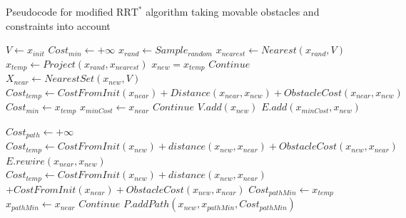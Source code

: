 \begin{algorithm}[H]
\caption{Pseudocode for modified $\text{RRT}^*$ algorithm taking movable obstacles and constraints into account}
\label{pseudocode:proposed_rrt_star}
\begin{algorithmic}[1]
\State $V \leftarrow x_{init}$
    \State $Cost_{min} \leftarrow +\infty$ 
    \State $x_{rand} \leftarrow Sample_{random}$
    \State $x_{nearest} \leftarrow Nearest(x_{rand}, V)$
    \State $x_{temp} \leftarrow Project(x_{rand}, x_{nearest})$
        \State $x_{new} = x_{temp}$
        \Else
        \State $Continue$
    \EndIf
    \bs 
    \State $X_{near} \leftarrow NearestSet(x_{new}, V)$ 
    \State $Cost_{temp} \leftarrow CostFromInit(x_{near}) + Distance(x_{near}, x_{new}) + ObstacleCost(x_{near}, x_{new})$
            \State $Cost_{min} \leftarrow x_{temp}$
            \State $x_{minCost} \leftarrow x_{near}$
            \EndIf
        \EndIf
    \EndFor
        \State $Continue$
    \Else
        \State $V.add(x_{new})$
        \State $E.add(x_{minCost}, x_{new})$
    \EndIf

    \bs
    \State $Cost_{path} \leftarrow +\infty$ 
        \State $Cost_{temp} \leftarrow CostFromInit(x_{new}) + distance(x_{new}, x_{near}) + ObstacleCost(x_{new}, x_{near})$
              \State $E.rewire(x_{near}, x_{new})$
           \EndIf
        \EndIf
      \Else {}
          \State $Cost_{temp} \leftarrow CostFromInit(x_{new}) + distance(x_{new}, x_{near}) $ \newline\hspace*{10em} $+ CostFromInit(x_{near}) + ObstacleCost(x_{new}, x_{near})$
                  \State $Cost_{pathMin} \leftarrow x_{temp}$
                  \State $x_{pathMin} \leftarrow x_{near}$
              \EndIf
          \EndIf
      \EndIf
          \State $Continue$
      \Else
          \State $P.addPath(x_{new}, x_{pathMin}, Cost_{pathMin})$
      \EndIf
    \EndFor
\EndWhile
\end{algorithmic}
\end{algorithm}






